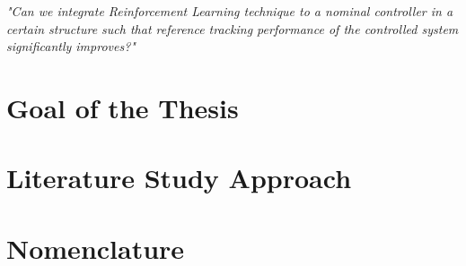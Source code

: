 \textit{"Can we integrate Reinforcement Learning technique to a nominal controller in a certain structure such that reference tracking performance of the controlled system significantly improves?"}

\section{Goal of the Thesis}

\section{Literature Study Approach}

\section{Nomenclature}


